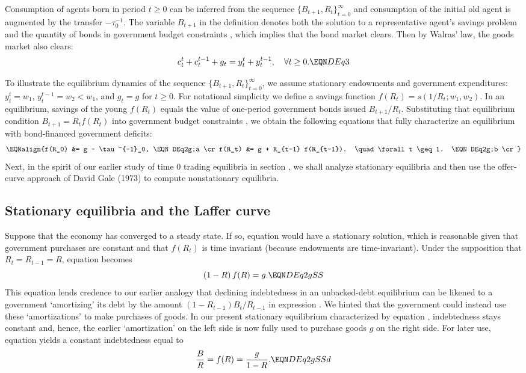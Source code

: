 \noindent
Consumption of agents born in period $t\geq 0$ can be
inferred from the sequence $\{B_{t+1}, R_t\}_{t=0}^\infty$ 
and consumption of the initial old agent is augmented by the
transfer $-\tau^{-1}_0$. The variable $B_{t+1}$ in the definition
denotes both the solution to a representative agent's savings 
problem  and the quantity of bonds in government 
budget constraints , which implies that the 
bond market clears. Then by Walras' law, the goods market also 
clears:
$$c_t^t + c_t^{t-1} + g_t = y_t^t + y_t^{t-1}, 
\quad \forall t \geq 0.        \EQN DEq3
$$


To illustrate the equilibrium dynamics of the sequence
$\{B_{t+1}, R_t\}_{t=0}^\infty$, we assume stationary
endowments and government expenditures: $y^t_t = w_1$,
$y^{t-1}_t=w_2<w_1$, and $g_t=g$ for $t\geq 0$. 
For notational simplicity we define a savings function
$f(R_t)= s(1/R_t; w_1, w_2)$. In an equilibrium, 
savings of the young $f(R_t)$ 
equals the value of one-period government bonds issued
$B_{t+1}/R_t$. Substituting that equilibrium condition
$B_{t+1}=R_t f(R_t)$ into government budget constraints
, we obtain the following equations that
fully characterize an equilibrium with bond-financed 
government deficits:
$$\EQNalign{f(R_0) &= g - \tau^{-1}_0,   \EQN DEq2g;a  \cr
            f(R_t) &= g + R_{t-1} f(R_{t-1}).  \quad \forall t \geq 1. 
                                          \EQN DEq2g;b \cr} $$
Next, in the spirit of our
earlier study of time 0 trading equilibria in 
section , we shall analyze 
stationary equilibria and then use the offer-curve approach 
of David Gale (1973) to compute nonstationary equilibria.



\subsection{Stationary equilibria and the Laffer curve}
Suppose that the economy has converged to a steady state. 
If so, equation  would have a stationary solution,
which is reasonable given that government 
purchases are constant and that $f(R_t)$ is time
invariant (because endowments are time-invariant).     
Under the supposition that $R_t=R_{t-1}=R$,
equation  becomes
$$ (1-R)\, f(R) = g.        \EQN DEq2gSS $$
This equation lends credence to our earlier analogy that 
declining indebtedness in an unbacked-debt equilibrium 
can be likened to a government `amortizing' its
debt by the amount $(1-R_{t-1})B_t/R_{t-1}$ in 
expression . We hinted that the government 
could instead use these `amortizations' to make 
purchases of goods. In our present stationary 
equilibrium characterized by equation ,
indebtedness stays constant and, hence, the earlier
`amortization' on the left side is now
fully used to purchase goods $g$ on the right side.
For later use, equation  yields a constant 
indebtedness equal to 
$$ {B \over R} = f(R) = {g \over 1-R}.    \EQN DEq2gSSd $$

